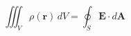 \documentclass{article}
\begin{document}
\[
\iiint_V \rho(\mathbf{r}) \, dV = \oint_S \mathbf{E} \cdot d\mathbf{A}
\]
\end{document}
